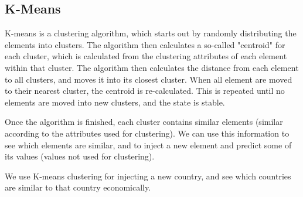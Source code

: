 \subsection{K-Means}
\label{Algo_KM}
K-means is a clustering algorithm, which starts out by randomly distributing the elements into clusters. The algorithm then calculates a so-called "centroid" for each cluster, which is calculated from the clustering attributes of each element within that cluster. The algorithm then calculates the distance from each element to all clusters, and moves it into its closest cluster. When all element are moved to their nearest cluster, the centroid is re-calculated. This is repeated until no elements are moved into new clusters, and the state is stable.

Once the algorithm is finished, each cluster contains similar elements (similar according to the attributes used for clustering). We can use this information to see which elements are similar, and to inject a new element and predict some of its values (values not used for clustering).

We use K-means clustering for injecting a new country, and see which countries are similar to that country economically.